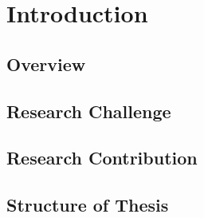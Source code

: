 

\chapter{Introduction} \label{Chapter:Introduction}

\section{Overview}
\section{Research Challenge}
\section{Research Contribution}
\section{Structure of Thesis}
